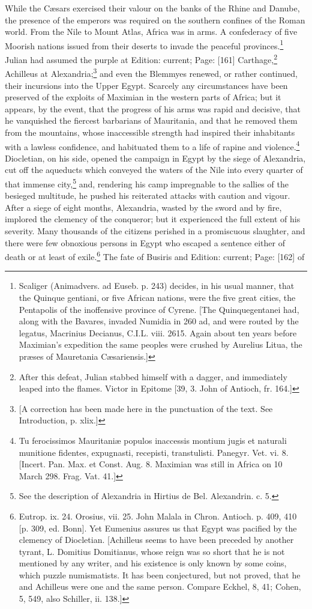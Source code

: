 While the Cæsars exercised their valour on the banks of the Rhine and Danube, the presence of the emperors was required on the southern confines of the Roman world. From the Nile to Mount Atlas, Africa was in arms. A confederacy of five Moorish nations issued from their deserts to invade the peaceful provinces.\footnote{Scaliger (Animadvers. ad Euseb. p. 243) decides, in his usual manner, that the Quinque gentiani, or five African nations, were the five great cities, the Pentapolis of the inoffensive province of Cyrene. [The Quinquegentanei had, along with the Bavares, invaded Numidia in 260 ad, and were routed by the legatus, Macrinius Decianus, C.I.L. viii. 2615. Again about ten years before Maximian\texthebrew{}’s expedition the same peoples were crushed by Aurelius Litua, the præses of Mauretania Cæsariensis.]} Julian had assumed the purple at Edition: current; Page: [161] Carthage,\footnote{After this defeat, Julian stabbed himself with a dagger, and immediately leaped into the flames. Victor in Epitome [39, 3. John of Antioch, fr. 164.]} Achilleus at Alexandria;\footnote{[A correction has been made here in the punctuation of the text. See Introduction, p. xlix.]} and even the Blemmyes renewed, or rather continued, their incursions into the Upper Egypt. Scarcely any circumstances have been preserved of the exploits of Maximian in the western parts of Africa; but it appears, by the event, that the progress of his arms was rapid and decisive, that he vanquished the fiercest barbarians of Mauritania, and that he removed them from the mountains, whose inaccessible strength had inspired their inhabitants with a lawless confidence, and habituated them to a life of rapine and violence.\footnote{Tu ferocissimos Mauritaniæ populos inaccessis montium jugis et naturali munitione fidentes, expugnasti, recepisti, transtulisti. Panegyr. Vet. vi. 8. [Incert. Pan. Max. et Const. Aug. 8. Maximian was still in Africa on 10 March 298. Frag. Vat. 41.]} Diocletian, on his side, opened the campaign in Egypt by the siege of Alexandria, cut off the aqueducts which conveyed the waters of the Nile into every quarter of that immense city,\footnote{See the description of Alexandria in Hirtius de Bel. Alexandrin. c. 5.} and, rendering his camp impregnable to the sallies of the besieged multitude, he pushed his reiterated attacks with caution and vigour. After a siege of eight months, Alexandria, wasted by the sword and by fire, implored the clemency of the conqueror; but it experienced the full extent of his severity. Many thousands of the citizens perished in a promiscuous slaughter, and there were few obnoxious persons in Egypt who escaped a sentence either of death or at least of exile.\footnote{Eutrop. ix. 24. Orosius, vii. 25. John Malala in Chron. Antioch. p. 409, 410 [p. 309, ed. Bonn]. Yet Eumenius assures us that Egypt was pacified by the clemency of Diocletian. [Achilleus seems to have been preceded by another tyrant, L. Domitius Domitianus, whose reign was so short that he is not mentioned by any writer, and his existence is only known by some coins, which puzzle numismatists. It has been conjectured, but not proved, that he and Achilleus were one and the same person. Compare Eckhel, 8, 41; Cohen, 5, 549, also Schiller, ii. 138.]} The fate of Busiris and Edition: current; Page: [162] of 